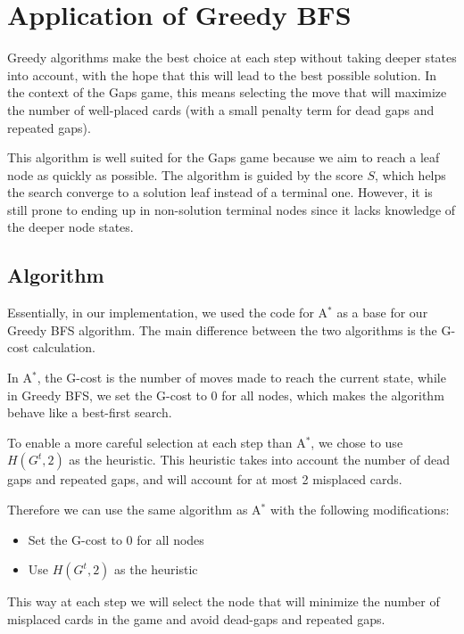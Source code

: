 \chapter{Application of Greedy BFS}
Greedy algorithms make the best choice at each step without taking deeper states into account, with the hope that this will lead to the best possible solution. In the context of the Gaps game, this means selecting the move that will maximize the number of well-placed cards (with a small penalty term for dead gaps and repeated gaps).

This algorithm is well suited for the Gaps game because we aim to reach a leaf node as quickly as possible. The algorithm is guided by the score $S$, which helps the search converge to a solution leaf instead of a terminal one. However, it is still prone to ending up in non-solution terminal nodes since it lacks knowledge of the deeper node states.

\section{Algorithm}
Essentially, in our implementation, we used the code for A$^*$ as a base for our Greedy BFS algorithm. The main difference between the two algorithms is the G-cost calculation.

In A$^*$, the G-cost is the number of moves made to reach the current state, while in Greedy BFS, we set the G-cost to 0 for all nodes, which makes the algorithm behave like a best-first search.

To enable a more careful selection at each step than A$^*$, we chose to use $H(G^t, 2)$ as the heuristic. This heuristic takes into account the number of dead gaps and repeated gaps, and will account for at most 2 misplaced cards.

Therefore we can use the same algorithm as A$^*$ with the following modifications:
\begin{itemize}
    \item Set the G-cost to 0 for all nodes
    \item Use $H(G^t, 2)$ as the heuristic
\end{itemize}

This way at each step we will select the node that will minimize the number of misplaced cards in the game and avoid dead-gaps and repeated gaps.

